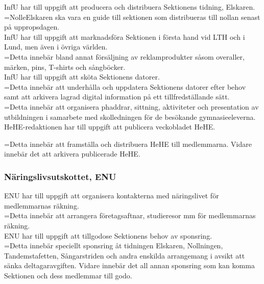 \documentclass[10pt]{article}
\begin{document}
\noindent InfU har till uppgift att producera och distribuera Sektionens
tidning, Elskaren. \\

\hangindent=\parindent NolleElskaren ska vara en guide till sektionen som
distribueras till nollan senast på uppropsdagen. \\

\noindent InfU har till uppgift att marknadsföra Sektionen i första hand
vid LTH och i Lund, men även i övriga världen. \\

\hangindent=\parindent Detta innebär bland annat försäljning av
reklamprodukter såsom overaller, märken, pins, T-shirts och sångböcker. \\

\noindent InfU har till uppgift att sköta Sektionens datorer.\\

\hangindent=\parindent Detta innebär att underhålla och uppdatera Sektionens
datorer efter behov samt att arkivera lagrad digital information på ett
tillfredställande sätt. \\

\hangindent=\parindent Detta innebär att organisera phaddrar, sittning,
aktiviteter och presentation av utbildningen i samarbete med skolledningen
för de besökande gymnasieeleverna. \\

\noindent HeHE-redaktionen har till uppgift att publicera veckobladet HeHE.

\hangindent=\parindent Detta innebär att framställa och distribuera HeHE till medlemmarna. Vidare innebär det att arkivera publicerade HeHE.

\subsubsection{Näringslivsutskottet, ENU}

ENU har till uppgift att organisera kontakterna med näringslivet för
medlemmarnas räkning. \\

\hangindent=\parindent Detta innebär att arrangera företagsaftnar,
studieresor mm för medlemmarnas räkning. \\

\noindent ENU har till uppgift att tillgodose Sektionens behov av
sponsring. \\

\hangindent=\parindent Detta innebär speciellt sponsring åt tidningen
Elskaren, Nollningen, Tandemstafetten, Sångarstriden och andra enskilda
arrangemang i avsikt att sänka deltagaravgiften. Vidare innebär det all
annan sponsring som kan komma Sektionen och dess medlemmar till godo. \\
\end{document}
